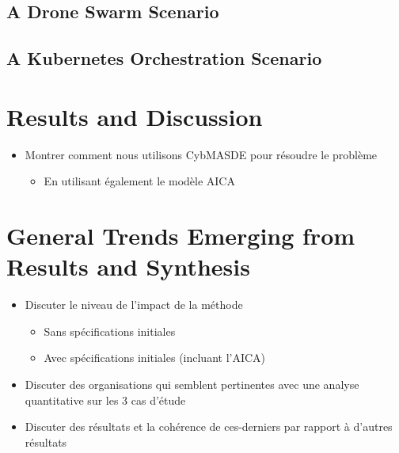 \subsection{A Drone Swarm Scenario}
\subsection{A Kubernetes Orchestration Scenario}


\section{Results and Discussion}
\begin{itemize}

    \item Montrer comment nous utilisons CybMASDE pour résoudre le problème
          \begin{itemize}
              \item En utilisant également le modèle AICA
          \end{itemize}
\end{itemize}

\section{General Trends Emerging from Results and Synthesis}
\begin{itemize}
    \item Discuter le niveau de l'impact de la méthode
          \begin{itemize}
              \item Sans spécifications initiales
              \item Avec spécifications initiales (incluant l'AICA)
          \end{itemize}
    \item Discuter des organisations qui semblent pertinentes avec une analyse quantitative sur les 3 cas d'étude
    \item Discuter des résultats et la cohérence de ces-derniers par rapport à d'autres résultats
\end{itemize}
